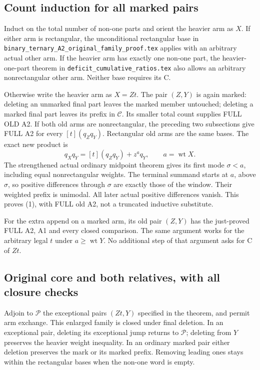 \subsection{Count induction for all marked pairs}
Induct on the total number of non-one parts and orient the heavier
arm as $X$. If either arm is rectangular, the unconditional rectangular
base in \texttt{binary\_ternary\_A2\_original\_family\_proof.tex} applies
with an arbitrary actual other arm. If the heavier arm has exactly
one non-one part, the heavier-one-part theorem in
\texttt{deficit\_cumulative\_ratios.tex} also allows an arbitrary
nonrectangular other arm. Neither base requires its C.

Otherwise write the heavier arm as $X=Zt$. The pair $(Z,Y)$ is again
marked: deleting an unmarked final part leaves the marked member
untouched; deleting a marked final part leaves its prefix in
$\mathcal C$. Its smaller total count supplies FULL OLD A2. If both
old arms are nonrectangular, the preceding two subsections give FULL
A2 for every $[t](q_Zq_Y)$. Rectangular old arms are the same bases.
The exact new product is
\[
 q_Xq_Y=[t](q_Zq_Y)+z^a q_Y,\qquad a=\operatorname{wt}X.
\]
The strengthened actual ordinary midpoint theorem gives its first
mode $\sigma<a$, including equal nonrectangular weights. The terminal
summand starts at $a$, above $\sigma$, so positive differences through
$\sigma$ are exactly those of the window. Their weighted prefix is
unimodal. All later actual positive differences vanish. This proves
(1), with FULL old A2, not a truncated inductive substitute.

For the extra append on a marked arm, its old pair $(Z,Y)$ has the
just-proved FULL A2, A1 and every closed comparison. The same argument
works for the arbitrary legal $t$ under $a\ge\operatorname{wt}Y$.
No additional step of that argument asks for C of $Zt$.

\subsection{Original core and both relatives, with all closure checks}
Adjoin to $\mathcal P$ the exceptional pairs $(Zt,Y)$ specified in the
theorem, and permit arm exchange. This enlarged family is closed
under final deletion. In an exceptional pair, deleting its exceptional
jump returns to $\mathcal P$; deleting from $Y$ preserves the heavier
weight inequality. In an ordinary marked pair either deletion preserves
the mark or its marked prefix. Removing leading ones stays within the
rectangular bases when the non-one word is empty.

